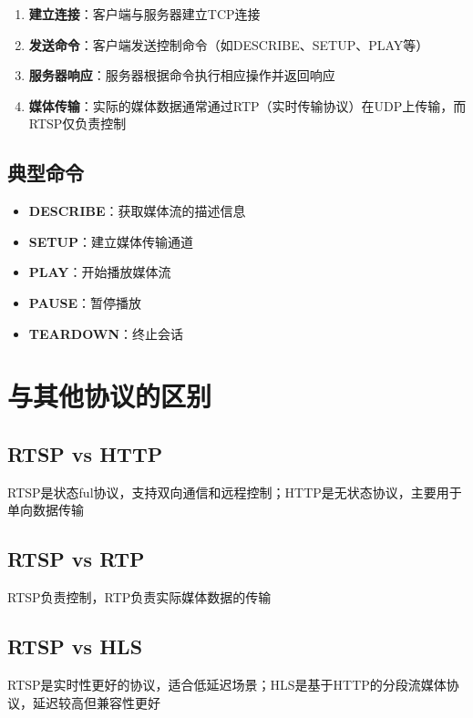 \documentclass[12pt,UTF8]{ctexbook}
\begin{document}
\begin{enumerate}
  \item \textbf{建立连接}：客户端与服务器建立TCP连接
  \item \textbf{发送命令}：客户端发送控制命令（如DESCRIBE、SETUP、PLAY等）
  \item \textbf{服务器响应}：服务器根据命令执行相应操作并返回响应
  \item \textbf{媒体传输}：实际的媒体数据通常通过RTP（实时传输协议）在UDP上传输，而RTSP仅负责控制
\end{enumerate}

\section{典型命令}

\begin{itemize}
  \item \textbf{DESCRIBE}：获取媒体流的描述信息
  \item \textbf{SETUP}：建立媒体传输通道
  \item \textbf{PLAY}：开始播放媒体流
  \item \textbf{PAUSE}：暂停播放
  \item \textbf{TEARDOWN}：终止会话
\end{itemize}

\chapter{与其他协议的区别}

\section{RTSP vs HTTP}

RTSP是状态ful协议，支持双向通信和远程控制；HTTP是无状态协议，主要用于单向数据传输

\section{RTSP vs RTP}

RTSP负责控制，RTP负责实际媒体数据的传输

\section{RTSP vs HLS}

RTSP是实时性更好的协议，适合低延迟场景；HLS是基于HTTP的分段流媒体协议，延迟较高但兼容性更好
\end{document}
